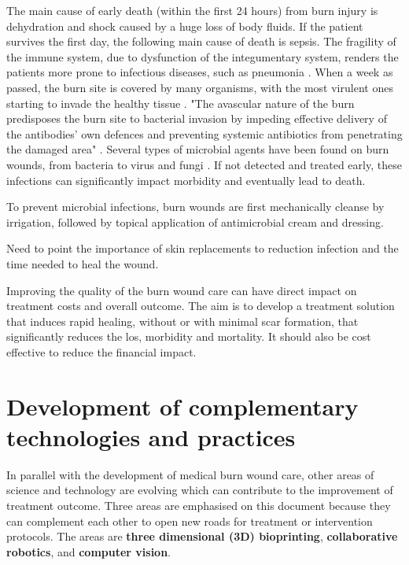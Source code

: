 The main cause of early death (within the first 24 hours) from burn injury is dehydration and shock caused by a huge loss of body fluids. If the patient survives the first day, the following main cause of death is sepsis. The fragility of the immune system, due to dysfunction of the integumentary system, renders the patients more prone to infectious diseases, such as pneumonia \cite{who2011_sucess_stories}. When a week as passed, the burn site is covered by many organisms, with the most virulent ones starting to invade the healthy tissue \cite{isbi_guidelines_burn_care}. "The avascular nature of the burn predisposes the burn site to bacterial invasion by impeding effective delivery of the antibodies’ own defences and preventing systemic antibiotics from penetrating the damaged area" \cite{isbi_guidelines_burn_care}. Several types of microbial agents have been found on burn wounds, from bacteria to virus and fungi \cite{Schaal2015a_fungal_infections,Shoja2017_acinetobacter}. If not detected and treated early, these infections can significantly impact morbidity and eventually lead to death.

To prevent microbial infections, burn wounds are first mechanically cleanse by irrigation, followed by topical application of antimicrobial cream and dressing. 

{\color{red}Need to point the importance of skin replacements to reduction infection and the time needed to heal the wound.}

Improving the quality of the burn wound care can have direct impact on treatment costs and overall outcome. The aim is to develop a treatment solution that induces rapid healing, without or with minimal scar formation, that significantly reduces the \gls{los}, morbidity and mortality. It should also be cost effective to reduce the financial impact. 


\section{Development of complementary technologies and practices} %
\label{sec:development_of_complementary_technologies_and_practices}

In parallel with the development of medical burn wound care, other areas of science and technology are evolving which can contribute to the improvement of treatment outcome. Three areas are emphasised on this document because they can complement each other to open new roads for treatment or intervention protocols. The areas are \textbf{three dimensional (3D) bioprinting}, \textbf{collaborative robotics}, and \textbf{computer vision}.

